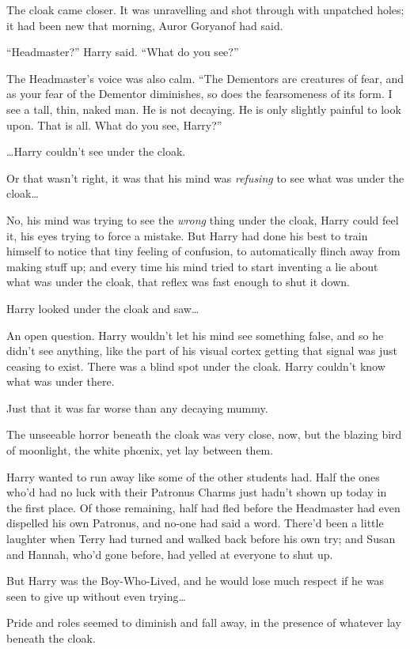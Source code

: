 The cloak came closer. It was unravelling and shot through with unpatched holes; it had been new that morning, Auror Goryanof had said.

“Headmaster?” Harry said. “What do you see?”

The Headmaster’s voice was also calm. “The Dementors are creatures of fear, and as your fear of the Dementor diminishes, so does the fearsomeness of its form. I see a tall, thin, naked man. He is not decaying. He is only slightly painful to look upon. That is all. What do you see, Harry?”

…Harry couldn’t see under the cloak.

Or that wasn’t right, it was that his mind was \emph{refusing} to see what was under the cloak…

No, his mind was trying to see the \emph{wrong} thing under the cloak, Harry could feel it, his eyes trying to force a mistake. But Harry had done his best to train himself to notice that tiny feeling of confusion, to automatically flinch away from making stuff up; and every time his mind tried to start inventing a lie about what was under the cloak, that reflex was fast enough to shut it down.

Harry looked under the cloak and saw…

An open question. Harry wouldn’t let his mind see something false, and so he didn’t see anything, like the part of his visual cortex getting that signal was just ceasing to exist. There was a blind spot under the cloak. Harry couldn’t know what was under there.

Just that it was far worse than any decaying mummy.

The unseeable horror beneath the cloak was very close, now, but the blazing bird of moonlight, the white phœnix, yet lay between them.

Harry wanted to run away like some of the other students had. Half the ones who’d had no luck with their Patronus Charms just hadn’t shown up today in the first place. Of those remaining, half had fled before the Headmaster had even dispelled his own Patronus, and no-one had said a word. There’d been a little laughter when Terry had turned and walked back before his own try; and Susan and Hannah, who’d gone before, had yelled at everyone to shut up.

But Harry was the Boy-Who-Lived, and he would lose much respect if he was seen to give up without even trying…

Pride and roles seemed to diminish and fall away, in the presence of whatever lay beneath the cloak.

